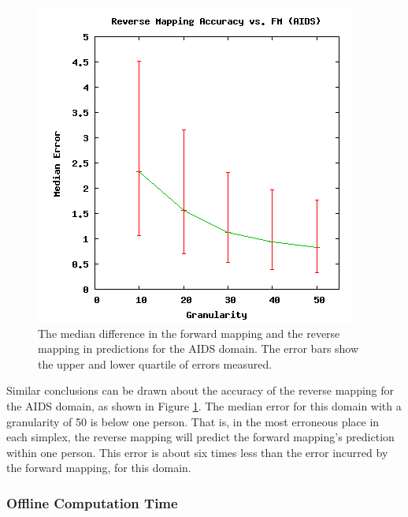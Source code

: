 \begin{figure}[ht]
\centering
\includegraphics[scale=.5]{images/results_aids/aids-rmacc.png}
\caption{The median difference in the forward mapping and the reverse mapping in predictions for the AIDS domain.
The error bars show the upper and lower quartile of errors measured.}
\label{fig:aidsrmacc}
\end{figure}

Similar conclusions can be drawn about the accuracy of the reverse mapping for the AIDS domain, as shown in Figure \ref{fig:aidsrmacc}.
The median error for this domain with a granularity of 50 is below one person.
That is, in the most erroneous place in each simplex, the reverse mapping will predict the forward mapping's prediction within one person.
This error is about six times less than the error incurred by the forward mapping, for this domain.



  \subsubsection{Offline Computation Time}

